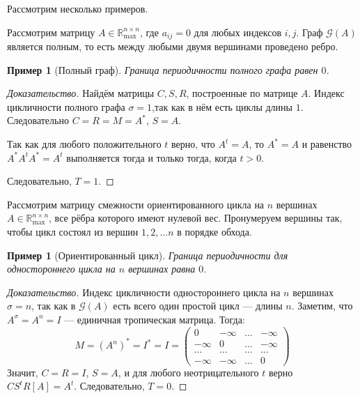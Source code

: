 \documentclass[12pt]{article}
\newtheorem{example}[theorem]{Пример}
\theoremstyle{definition}
\begin{document}
Рассмотрим несколько примеров.

Рассмотрим матрицу $A \in \mathbb{R}_{\max}^{n \times n}$, где $a_{ij} = 0$ для любых индексов $i, j$. Граф $\mathcal{G}(A)$ является полным, то есть между любыми двумя вершинами проведено ребро.

\begin{example} [Полный граф]
Граница периодичности полного графа равен $0$.
\end{example}
\begin{proof}[Доказательство]
Найдём матрицы $C, S, R$, построенные по матрице $A$. Индекс цикличности полного графа $\sigma = 1$,так как в нём есть циклы длины $1$. Следовательно $C = R = M = A^*$, $S = A$.

Так как для любого положительного $t$ верно, что $A^t = A$, то $A^* = A$ и равенство $A^*A^tA^* = A^t$ выполняется тогда и только тогда, когда $t > 0$.

Следовательно, $T = 1$.
\end{proof}

Рассмотрим матрицу смежности ориентированного цикла на $n$ вершинах $A \in \mathbb{R}_{\max}^{n \times n}$, все рёбра которого имеют нулевой вес. Пронумеруем вершины так, чтобы цикл состоял из вершин $1, 2, \dots n$ в порядке обхода.

\begin{example}[Ориентированный цикл]
\label{directedCycleExample}
Граница периодичности для одностороннего цикла на $n$ вершинах равна $0$.
\end{example}
\begin{proof}[Доказательство]
Индекс цикличности одностороннего цикла на $n$ вершинах $\sigma = n$, так как в $\mathcal{G}(A)$ есть всего один простой цикл --- длины $n$. Заметим, что $A^{\sigma} = A^n = I$ --- единичная тропическая матрица. Тогда:
\begin{equation*}
M = (A^n)^* = I^* = I = \begin{pmatrix}
0 & -\infty & ... & -\infty \\
-\infty & 0 & ... & -\infty \\
... & ... & ... & ... \\
-\infty & -\infty & ... & 0
\end{pmatrix}
\end{equation*}
Значит, $C = R = I$, $S = A$, и для любого неотрицательного $t$ верно $CS^tR[A] = A^t$. Следовательно, $T = 0$.
\end{proof}
\end{document}
